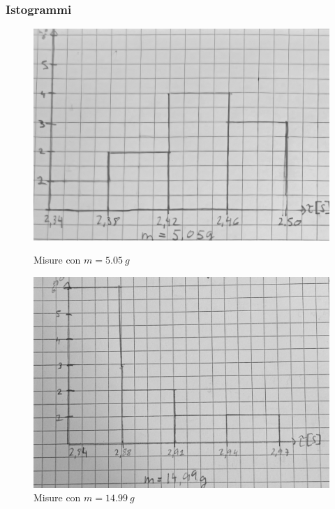 \documentclass[a4paper]{article}
\begin{document}
{\subsubsection{Istogrammi}
\FloatBarrier
\begin{figure}[!htbp]
    \begin{minipage}[b]{0.45\textwidth}
        \includegraphics[width=\textwidth]{fotomolla/Molla 1/5.05.jpg}
        \caption{Misure con $m=\SI{5.05}{g}$}
    \end{minipage}
    \hfil
     \begin{minipage}[b]{0.45\textwidth}
        \includegraphics[width=\textwidth]{fotomolla/Molla 1/14.99.jpg}
        \caption{Misure con $m=\SI{14.99}{g}$}
    \end{minipage}
\end{figure}

}
\end{document}
